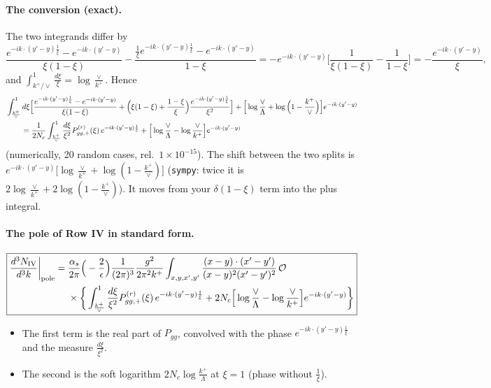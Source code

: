 \documentclass[10pt]{article}
\numberwithin{equation}{section}
\newcommand{\OO}{\mathcal O}
\newcommand{\preLO}{\frac{1}{(2\pi)^3}\frac{g^2}{2\pi^2k^+}}
\newcommand{\XX}{\frac{(x-y)\cdot(x'-y')}{(x-y)^{2}(x'-y')^{2}}}
\newcommand{\ph}{e^{-ik\cdot(y'-y)\frac{1}{\xi}}}
\newcommand{\phone}{e^{-ik\cdot(y'-y)}}
\begin{document}
\paragraph{The conversion (exact).} The two integrands differ by
\begin{equation*}
\frac{\ph-\phone}{\xi(1-\xi)}-\frac{\frac1\xi\ph-\phone}{1-\xi}=-\phone\Big[\frac{1}{\xi(1-\xi)}-\frac{1}{1-\xi}\Big]=-\frac{\phone}{\xi},
\end{equation*}
and $\int_{k^+/\vee}^1\frac{d\xi}{\xi}=\log\frac{\vee}{k^+}$. Hence
\begin{align}
&\int_{\frac{k^{+}}{\vee}}^{1}d\xi\Big[\frac{\ph-\phone}{\xi(1-\xi)}+\Big(\xi(1-\xi)+\frac{1-\xi}{\xi}\Big)\frac{\ph}{\xi^2}\Big]+\Big[\log\frac{\vee}{\Lambda}+\log\Big(1-\frac{k^{+}}{\vee}\Big)\Big]\phone\notag\\
&\qquad=\frac{1}{2N_c}\int_{\frac{k^+}{\vee}}^1\frac{d\xi}{\xi^2}P^{(r)}_{gg,+}(\xi)\,\ph+\Big[\log\frac{\vee}{\Lambda}-\log\frac{\vee}{k^+}\Big]\phone
\label{eq:conv}
\end{align}
(numerically, 20 random cases, rel.\ $1\times10^{-15}$). The shift between the two splits is $\phone\big[\log\frac{\vee}{k^+}+\log(1-\frac{k^+}{\vee})\big]$ (\texttt{sympy}: twice it is $2\log\frac{\vee}{k^+}+2\log(1-\frac{k^+}{\vee})$). It moves from your $\delta(1-\xi)$ term into the plus integral.

\paragraph{The pole of Row IV in standard form.}
\begin{equation}
\boxed{\begin{aligned}\frac{d^{3}N_{\rm IV}}{d^{3}k}\bigg|_{\rm pole}={}&\frac{\alpha_s}{2\pi}\Big(-\frac{2}{\epsilon}\Big)\preLO\int_{x,y,x',y'}\XX\,\OO\\
&\times\bigg\{\int_{\frac{k^+}{\vee}}^1\frac{d\xi}{\xi^2}P^{(r)}_{gg,+}(\xi)\,\ph+2N_c\Big[\log\frac{\vee}{\Lambda}-\log\frac{\vee}{k^+}\Big]\phone\bigg\}\end{aligned}}
\label{eq:polestd}
\end{equation}
\begin{itemize}
\item The first term is the real part of $P_{gg}$, convolved with the phase $\ph$ and the measure $\frac{d\xi}{\xi^2}$.
\item The second is the soft logarithm $2N_c\log\frac{k^+}{\Lambda}$ at $\xi=1$ (phase without $\frac1\xi$).
\end{itemize}
\end{document}
